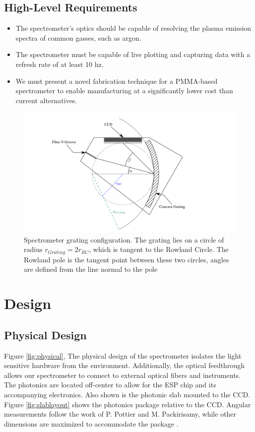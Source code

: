 \documentclass{article}
\begin{document}
    \subsection{High-Level Requirements}
        \begin{itemize}
            \item The spectrometer's optics should be capable of resolving the plasma emission spectra of common gasses, such as argon.
            \item The spectrometer must be capable of live plotting and capturing data with a refresh rate of at least 10 hz.
            \item We must present a novel fabrication technique for a PMMA-based spectrometer to enable manufacturing at a significantly lower cost than current alternatives.
        \end{itemize}
       \begin{figure}[H]
       
    \centering
    \def\svgwidth{0.8 \columnwidth}
    \includegraphics{images/grating_diagram_dd.png}
    \caption{\label{fig:spec_intro}Spectrometer grating configuration. The grating lies on a circle of radius $r_{Grating} = 2 r_{RC}$, which is tangent to the Rowland Circle. The Rowland pole is the tangent point between these two circles, angles are defined from the line normal to the pole}
    \end{figure}
    

\section{Design}
    \subsection{Physical Design}
    Figure \ref{fig:physical}, The physical design of the spectrometer isolates the light sensitive hardware from the environment. Additionally, the optical feedthrough allows our spectrometer to connect to external optical fibers and instruments. The photonics are located off-center to allow for the ESP chip and its accompanying electronics. Also shown is the photonic slab mounted to the CCD. Figure \ref{fig:slablayout} shows the photonics package relative to the CCD. Angular measurements follow the work of P. Pottier and M. Packirisamy, while other dimensions are maximized to accommodate the package \cite{Packirisamy2013DesignMirrors}.
    
\end{document}
